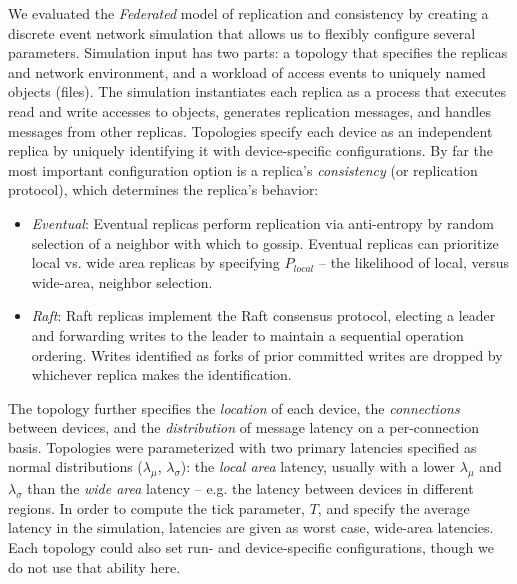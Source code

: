 \documentclass[10pt,conference,letterpaper]{IEEEtran}
\begin{document}

We evaluated the \emph{Federated} model of replication and consistency by creating a
discrete event network simulation that allows us to flexibly configure several parameters.
Simulation input has two parts: a topology that specifies the replicas and
network environment, and a workload of access events to uniquely named objects
(files).
The simulation instantiates each replica as a process that executes read and
write accesses to objects, generates replication messages, and
handles messages from other replicas.
Topologies specify each device as an independent replica by uniquely identifying it
with device-specific configurations.
By far the most important configuration option is a replica's \textit{consistency} (or replication
protocol), which determines the replica's behavior:
\begin{itemize}
    \item \emph{Eventual}: Eventual replicas perform replication via anti-entropy by random
      selection of a neighbor with which to gossip. Eventual  replicas can prioritize
      local vs. wide area replicas by specifying $P_{local}$ -- the likelihood
      of local, versus wide-area, neighbor selection.
    \item \emph{Raft}: Raft replicas implement the Raft consensus protocol, electing a
      leader and forwarding writes to the leader to maintain a sequential
      operation ordering.
      Writes identified as forks of prior committed writes are dropped by
      whichever replica makes the identification.
\end{itemize}

The topology further specifies the \textit{location} of each device, the
\textit{connections} between devices, and the \textit{distribution} of message latency on
a per-connection basis.
Topologies were parameterized with two primary latencies specified as normal distributions ($\lambda_{\mu}$,
$\lambda_{\sigma}$): the \textit{local area} latency, usually with a lower $\lambda_{\mu}$
and $\lambda_{\sigma}$ than the \textit{wide area} latency -- e.g.
the latency between devices in different regions.
In order to compute the tick parameter, $T$, and specify the average latency in the
simulation, latencies are given as worst case, wide-area latencies.
Each topology could also set run- and device-specific configurations, though we
do not use that ability here.
\end{document}
